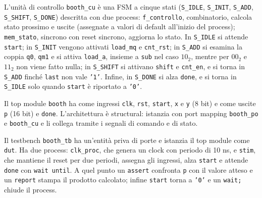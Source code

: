 
L'unità di controllo \texttt{booth\_cu} è una FSM a cinque stati (\texttt{S\_IDLE}, \texttt{S\_INIT}, \texttt{S\_ADD}, \texttt{S\_SHIFT}, \texttt{S\_DONE}) descritta con due process: \texttt{f\_controllo}, combinatorio, calcola stato prossimo e uscite (assegnate a valori di default all'inizio del process); \texttt{mem\_stato}, sincrono con reset sincrono, aggiorna lo stato. In \texttt{S\_IDLE} si attende \texttt{start}; in \texttt{S\_INIT} vengono attivati \texttt{load\_mq} e \texttt{cnt\_rst}; in \texttt{S\_ADD} si esamina la coppia \texttt{q0}, \texttt{qm1} e si attiva \texttt{load\_a}, insieme a \texttt{sub} nel caso $10_2$, mentre per $00_2$ e $11_2$ non viene fatto nulla; in \texttt{S\_SHIFT} si attivano \texttt{shift} e \texttt{cnt\_en}, e si torna in \texttt{S\_ADD} finché \texttt{last} non vale \texttt{'1'}. Infine, in \texttt{S\_DONE} si alza \texttt{done}, e si torna in \texttt{S\_IDLE} solo quando \texttt{start} è riportato a \texttt{'0'}.


Il top module \texttt{booth} ha come ingressi \texttt{clk}, \texttt{rst}, \texttt{start}, \texttt{x} e \texttt{y} (8 bit) e come uscite \texttt{p} (16 bit) e \texttt{done}. L'architettura è structural: istanzia con port mapping \texttt{booth\_po} e \texttt{booth\_cu} e li collega tramite i segnali di comando e di stato.


\simulazione

Il testbench \texttt{booth\_tb} ha un'entità priva di porte e istanzia il top module come \texttt{dut}. Ha due process: \texttt{clk\_proc}, che genera un clock con periodo di 10 ns, e \texttt{stim}, che mantiene il reset per due periodi, assegna gli ingressi, alza \texttt{start} e attende \texttt{done} con \texttt{wait until}. A quel punto un \texttt{assert} confronta \texttt{p} con il valore atteso e un \texttt{report} stampa il prodotto calcolato; infine \texttt{start} torna a \texttt{'0'} e un \texttt{wait;} chiude il process. 


